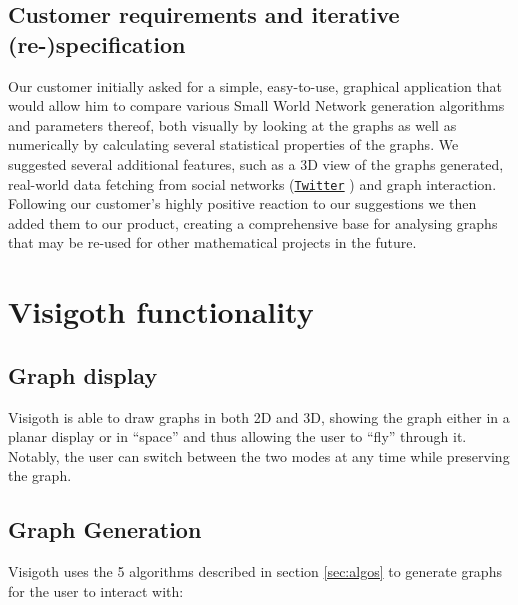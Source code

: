 \documentclass[a4paper,11pt,titlepage]{article}
\let\stdhref\href
\renewcommand{\href}[2]{\stdhref{#1}{\texttt{#2}}}
\let\stdsection\section         %
\renewcommand{\section}{\newpage\stdsection}
\newcommand{\Twitter}{\href{http://twitter.com}{Twitter} }
\begin{document}
\subsection{Customer requirements and iterative (re-)specification}

%
%

Our customer initially asked for a simple, easy-to-use, graphical
application that would allow him to compare various Small World
Network generation algorithms and parameters thereof, both visually
by looking at the graphs as well as numerically by calculating
several statistical properties of the graphs.
We suggested several additional features, such as a 3D view of the
graphs generated, real-world data fetching from social networks
(\Twitter) and graph interaction. Following our customer's highly
positive reaction to our suggestions we then added them to our
product, creating a comprehensive base for analysing graphs that
may be re-used for other mathematical projects in the future.

\section{Visigoth functionality}


\subsection{Graph display}
Visigoth is able to draw graphs in both 2D and 3D, showing the graph
either in a planar display or in ``space'' and thus allowing the user
to ``fly'' through it. Notably, the user can switch between the two
modes at any time while preserving the graph.

\subsection{Graph Generation}
Visigoth uses the 5 algorithms described in section \ref{sec:algos} to generate
graphs for the user to interact with:
\end{document}
